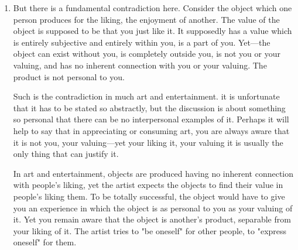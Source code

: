 \documentclass[10pt,twoside]{memoir}
\begin{document}
\begin{enumerate}
{\begin{enumerate}
People have every reason, then, to ask the artist: Is your product good for 
me even if I don't like or enjoy it? This question really lays art open. One of 
the distinguishing features of art has always been that it is very difficult to 
defend art without referring to people's liking or enjoying it. (Functions of 
art such as making money or glorifying the social order are real enough, but 
they are rarely cited in defense of art. Let us put them aside.) When one 
artist shows his latest production to another, all he can usually ask is "Do 
you like it?" Once the "scientific" justification of art is discredited, the 
artist usually has to admit: If you don't like or enjoy my product, there's no 
reason why you should "consume" it. 

There are exceptions. Art sometimes becomes the sole channel for political 
dissent, the sole arena in which oppressive social relations can be 
transcended. Even so, subjectivity of value remains a feature which 
distinguishes art and entertainment from other activities. Thus art is 
historically a leisure activity. 

\item But there is a fundamental contradiction here. Consider the object which 
one person produces for the liking, the enjoyment of another. The value of 
the object is supposed to be that you just like it. It supposedly has a value 
which is entirely subjective and entirely within you, is a part of you. Yet---the 
object can exist without you, is completely outside you, is not you or your 
valuing, and has no inherent connection with you or your valuing. The 
product is not personal to you. 

Such is the contradiction in much art and entertainment. it is unfortunate 
that it has to be stated so abstractly, but the discussion is about something 
so personal that there can be no interpersonal examples of it. Perhaps it will 
help to say that in appreciating or consuming art, you are always aware that 
it is not you, your valuing---yet your liking it, your valuing it is usually the 
only thing that can justify it. 

In art and entertainment, objects are produced having no inherent 
connection with people's liking, yet the artist expects the objects to find 
their value in people's liking them. To be totally successful, the object would 
have to give you an experience in which the object is as personal to you as 
your valuing of it. Yet you remain aware that the object is another's 
product, separable from your liking of it. The artist tries to "be oneself" for 
other people, to "express oneself" for them. 


\end{enumerate}}
\end{enumerate}
\end{document}
